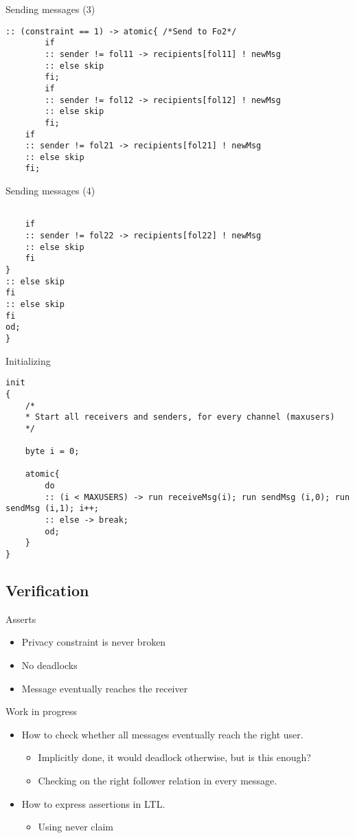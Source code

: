 \documentclass[10pt]{beamer}
\begin{document}
	\begin{frame}[fragile]{Sending messages (3)}
		\begin{lstlisting}
:: (constraint == 1) -> atomic{ /*Send to Fo2*/
	  	if
	  	:: sender != fol11 -> recipients[fol11] ! newMsg
	  	:: else skip
	  	fi;
	  	if
	  	:: sender != fol12 -> recipients[fol12] ! newMsg
	  	:: else skip
	  	fi;
	if
	:: sender != fol21 -> recipients[fol21] ! newMsg
	:: else skip
	fi;
\end{lstlisting}
\end{frame}	

\begin{frame}[fragile]{Sending messages (4)}
\begin{lstlisting}

	if
	:: sender != fol22 -> recipients[fol22] ! newMsg
	:: else skip
	fi
}
:: else skip
fi
:: else skip
fi
od;
}
\end{lstlisting}
\end{frame}

	\begin{frame}[fragile]{Initializing}
		\begin{lstlisting}
init
{
	/*
	* Start all receivers and senders, for every channel (maxusers) 
	*/
	
	byte i = 0;
	
	atomic{
		do
		:: (i < MAXUSERS) -> run receiveMsg(i); run sendMsg (i,0); run sendMsg (i,1); i++;
		:: else -> break;
		od;
	}
}
		\end{lstlisting}
	\end{frame}
	
	\subsection{Verification}
	
	\begin{frame}{Asserts}
		\begin{itemize}
			\item Privacy constraint is never broken
			\item No deadlocks
			\item Message eventually reaches the receiver 
		\end{itemize}
	\end{frame}
	
	\begin{frame}{Work in progress}
		\begin{itemize}
			\item How to check whether all messages eventually reach the right user.
			\begin{itemize}
				\item Implicitly done, it would deadlock otherwise, but is this enough?
				\item Checking on the right follower relation in every message.
			\end{itemize}
			\item How to express assertions in LTL.
			\begin{itemize}
				\item Using never claim
			\end{itemize}
		\end{itemize}
	\end{frame}
\end{document}
